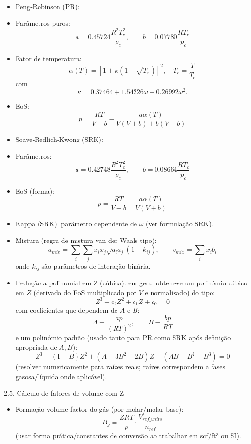 \documentclass[11pt,a4paper]{article}
\begin{document}
\begin{itemize}
\item Peng‑Robinson (PR):
\item Parâmetros puros:
  $$a = 0.45724\dfrac{R^2 T_c^2}{p_c},\qquad b = 0.07780\dfrac{R T_c}{p_c}$$
\item Fator de temperatura:
  $$\alpha(T)=\left[1+\kappa (1-\sqrt{T_r})\right]^2,\quad T_r=\dfrac{T}{T_c}$$
  com
  $$\kappa = 0.37464 + 1.54226\omega - 0.26992\omega^2.$$
\item EoS:
  $$p=\dfrac{RT}{V-b}-\dfrac{a\alpha(T)}{V(V+b)+b(V-b)}$$
\end{itemize}

\begin{itemize}
\item Soave‑Redlich‑Kwong (SRK):
\item Parâmetros:
  $$a = 0.42748\dfrac{R^2T_c^2}{p_c},\qquad b=0.08664\dfrac{RT_c}{p_c}$$
\item EoS (forma):
  $$p=\dfrac{RT}{V-b}-\dfrac{a\alpha(T)}{V(V+b)}$$
\item Kappa (SRK): parâmetro dependente de $\omega$ (ver formulação SRK).
\end{itemize}

\begin{itemize}
\item Mistura (regra de mistura van der Waals tipo):
  $$a_{mix}=\sum_i\sum_j x_i x_j \sqrt{a_i a_j}(1-k_{ij}),\qquad b_{mix}=\sum_i x_i b_i$$
  onde $k_{ij}$ são parâmetros de interação binária.
\end{itemize}

\begin{itemize}
\item Redução a polinomial em Z (cúbica): em geral obtem‑se um polinómio cúbico em $Z$ (derivado do EoS multiplicado por $V$ e normalizado) do tipo:
  $$Z^3 + c_2 Z^2 + c_1 Z + c_0 = 0$$
  com coeficientes que dependem de $A$ e $B$:
  $$A=\dfrac{a p}{(R T)^2},\qquad B=\dfrac{b p}{R T}$$
  e um polinómio padrão (usado tanto para PR como SRK após definição apropriada de $A,B$):
  $$Z^3-(1-B)Z^2+(A-3B^2-2B)Z-(AB-B^2-B^3)=0$$
  (resolver numericamente para raízes reais; raízes correspondem a fases gasosa/líquida onde aplicável).
\end{itemize}

2.5. Cálculo de fatores de volume com Z
\begin{itemize}
\item Formação volume factor do gás (por molar/molar base):
  $$B_g = \dfrac{Z R T}{p}\cdot\dfrac{V_{ref\_units}}{n_{ref}}$$
  (usar forma prática/constantes de conversão ao trabalhar em scf/ft³ ou SI).
\end{itemize}
\end{document}
